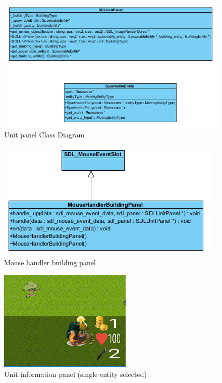 \begin{figure}
    \centering
    \includegraphics[scale=0.8]{res/unit-panel-class-diagram.png}
    \caption{Unit panel Class Diagram}\label{fig:unit-panel-class-diagram}
\end{figure}

\begin{figure}
    \centering
    \includegraphics[scale=0.8]{res/mousehandlerbuildingpanel.png}
    \caption{Mouse handler building panel}\label{fig:mousehandlerbuildingpanel}
\end{figure}

\begin{figure}
    \centering
    \includegraphics[scale=0.8]{res/unitinfopanel-single-entity.png}
    \caption{Unit information panel (single entity selected)}\label{fig:unitinfopanelsingleentity}
\end{figure}

